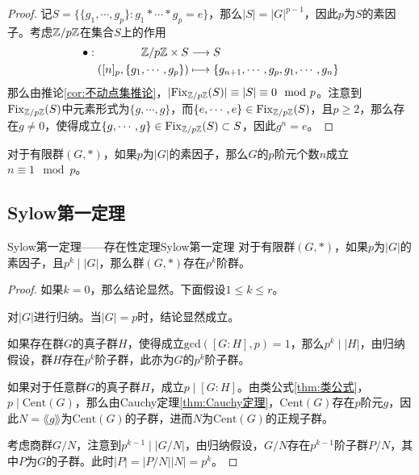 \begin{proof}
	记$S=\{ \{g_1,\cdots,g_p\}:g_1*\cdots*g_p=e \}$，那么$|S|=|G|^{p-1}$，因此$p$为$S$的素因子。考虑$\mathbb{Z}/p\mathbb{Z}$在集合$S$上的作用
	\begin{align*}
		\bullet:\begin{aligned}[t]
			\mathbb{Z}/p\mathbb{Z}\times S&\longrightarrow S\\
			([n]_p,\{g_1,\cdots,g_p\})&\longmapsto\{ g_{n+1},\cdots,g_{p},g_1,\cdots,g_n \}
		\end{aligned}
	\end{align*}
	那么由推论\ref{cor:不动点集推论}，$|\mathrm{Fix}_{\mathbb{Z}/p\mathbb{Z}}(S)|\equiv |S|\equiv 0\mod p$。注意到$\mathrm{Fix}_{\mathbb{Z}/p\mathbb{Z}}(S)$中元素形式为$\{g,\cdots,g\}$，而$\{e,\cdots,e\}\in\mathrm{Fix}_{\mathbb{Z}/p\mathbb{Z}}(S)$，且$p\ge 2$，那么存在$g\ne 0$，使得成立$\{g,\cdots,g\}\in\mathrm{Fix}_{\mathbb{Z}/p\mathbb{Z}}(S)\subset S$，因此$g^n=e$。
\end{proof}

\begin{corollary}
	对于有限群$(G,*)$，如果$p$为$|G|$的素因子，那么$G$的$p$阶元个数$n$成立$n\equiv 1\mod p$。
\end{corollary}

\subsection{Sylow第一定理}

\begin{theorem}{Sylow第一定理——存在性定理}{Sylow第一定理}
	对于有限群$(G,*)$，如果$p$为$|G|$的素因子，且$p^k\mid |G|$，那么群$(G,*)$存在$p^k$阶群。
\end{theorem}

\begin{proof}
	如果$k=0$，那么结论显然。下面假设$1\le k\le r$。
	
	对$|G|$进行归纳。当$|G|=p$时，结论显然成立。
	
	如果存在群$G$的真子群$H$，使得成立$\mathrm{gcd}([G:H],p)=1$，那么$p^k\mid |H|$，由归纳假设，群$H$存在$p^k$阶子群，此亦为$G$的$p^k$阶子群。
	
	如果对于任意群$G$的真子群$H$，成立$p\mid [G:H]$。由类公式\ref{thm:类公式}，$p\mid\mathrm{Cent}(G)$，那么由Cauchy定理\ref{thm:Cauchy定理}，$\mathrm{Cent}(G)$存在$p$阶元$g$，因此$N=\lang g \rang$为$\mathrm{Cent}(G)$的子群，进而$N$为$\mathrm{Cent}(G)$的正规子群。
	
	考虑商群$G/N$，注意到$p^{k-1}\mid |G/N|$，由归纳假设，$G/N$存在$p^{k-1}$阶子群$P/N$，其中$P$为$G$的子群。此时$|P|=|P/N||N|=p^k$。
\end{proof}


